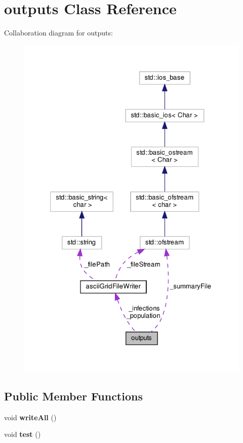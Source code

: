\hypertarget{classoutputs}{}\section{outputs Class Reference}
\label{classoutputs}


Collaboration diagram for outputs\+:
\nopagebreak
\begin{figure}[H]
\begin{center}
\leavevmode
\includegraphics[width=326pt]{classoutputs__coll__graph}
\end{center}
\end{figure}
\subsection*{Public Member Functions}
\begin{DoxyCompactItemize}
\item 
\mbox{\label{classoutputs_a84e606322d80c26a9afd60f25d3d9fba}} 
void {\bfseries write\+All} ()
\item 
\mbox{\label{classoutputs_aca2eded868d51846d8521ea6534bd227}} 
void {\bfseries test} ()
\end{DoxyCompactItemize}
